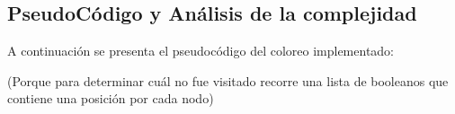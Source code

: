 







\subsection{PseudoCódigo y Análisis de la complejidad}

A continuación se presenta el pseudocódigo del coloreo implementado:

\begin{algorithmic}
	 (Porque para determinar cuál no fue visitado recorre una lista de booleanos que contiene una posición por cada nodo)
		\ENDIF
	\ENDWHILE
\ENDWHILE
\end{algorithmic}


